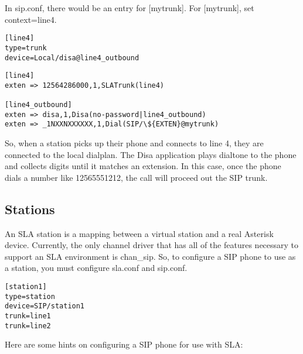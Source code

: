 In sip.conf,  there would be an entry for [mytrunk].  For [mytrunk], 
set context=line4.


\begin{verbatim}
[line4]
type=trunk
device=Local/disa@line4_outbound
\end{verbatim}


\begin{verbatim}
[line4]
exten => 12564286000,1,SLATrunk(line4)

[line4_outbound]
exten => disa,1,Disa(no-password|line4_outbound)
exten => _1NXXNXXXXXX,1,Dial(SIP/\${EXTEN}@mytrunk)
\end{verbatim}


So, when a station picks up their phone and connects to line 4, they are
connected to the local dialplan.  The Disa application plays dialtone to the
phone and collects digits until it matches an extension.  In this case, once
the phone dials a number like 12565551212, the call will proceed out the
SIP trunk.

\subsection{Stations}

An SLA station is a mapping between a virtual station and a real Asterisk device.
Currently, the only channel driver that has all of the features necessary to
support an SLA environment is chan\_sip.  So, to configure a SIP phone to use
as a station, you must configure sla.conf and sip.conf.  

\begin{verbatim}
[station1]
type=station
device=SIP/station1
trunk=line1
trunk=line2
\end{verbatim}

Here are some hints on configuring a SIP phone for use with SLA:


